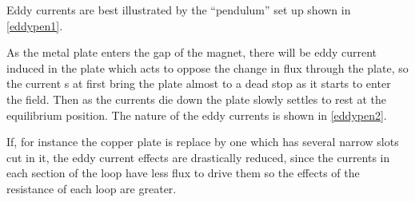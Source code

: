 \documentclass[english,a4paper,12pt]{report}
\begin{document}
Eddy currents are best illustrated by the ``pendulum'' set up shown in \cref{eddypen1}.


As the metal plate enters the gap of the magnet, there will be eddy current induced in the plate which acts to oppose the change in flux through the plate, so the current s at first bring the plate almost to a dead stop as it starts to enter the field. Then as the currents die down the plate slowly settles to rest at the equilibrium position. The nature of the eddy currents is shown in \cref{eddypen2}.  

If, for instance the copper plate is replace by one which has several narrow slots cut in it, the eddy current effects are drastically reduced, since the currents in each section of the loop have less flux to drive them so the effects of the resistance of each loop are greater. 
\end{document}
